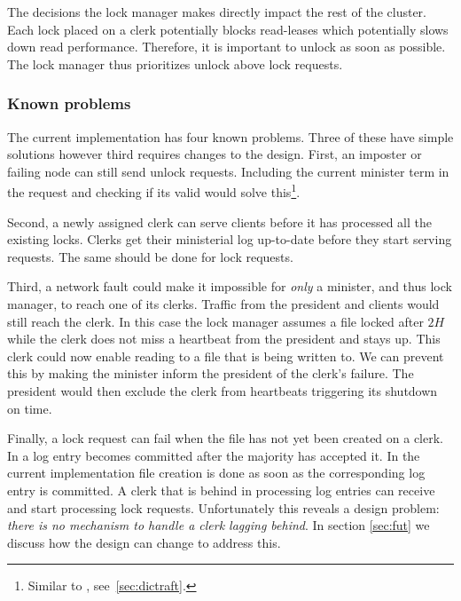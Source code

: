 The decisions the lock manager makes directly impact the rest of the cluster. Each lock placed on a clerk potentially blocks read-leases which potentially slows down read performance. Therefore, it is important to unlock as soon as possible. The lock manager thus prioritizes unlock above lock requests.
%
\subsubsection*{Known problems}
The current implementation has four known problems. Three of these have simple solutions however third requires changes to the design. First, an imposter or failing node can still send unlock requests. Including the current minister term in the request and checking if its valid would solve this\footnote{Similar to \graft{}, see~\cref{sec:dictraft}.}. 

Second, a newly assigned clerk can serve clients before it has processed all the existing locks. Clerks get their ministerial \raft{} log up-to-date before they start serving requests. The same should be done for lock requests. 

Third, a network fault could make it impossible for \textit{only} a minister, and thus lock manager, to reach one of its clerks. Traffic from the president and clients would still reach the clerk. In this case the lock manager assumes a file locked after $2H$ while the clerk does not miss a heartbeat from the president and stays up. This clerk could now enable reading to a file that is being written to. We can prevent this by making the minister inform the president of the clerk's failure. The president would then exclude the clerk from heartbeats triggering its shutdown on time. 

Finally, a lock request can fail when the file has not yet been created on a clerk. In \raft{} a log entry becomes committed after the majority has accepted it. In the current implementation file creation is done as soon as the corresponding log entry is committed. A clerk that is behind in processing log entries can receive and start processing lock requests. Unfortunately this reveals a design problem: \textit{there is no mechanism to handle a clerk lagging behind}. In section \cref{sec:fut} we discuss how the design can change to address this.
